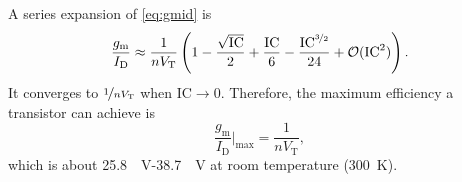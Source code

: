 \documentclass{article}[11pt]
\begin{document}
A series expansion of \eqref{eq:gmid} is
\begin{equation}\label{eq:gmid-exp}
\frac{g_{\mathrm{m}}}{I_{\mathrm{D}}} \approx \frac{1}{n V_{\mathrm{T}}} \left(1- \frac{\sqrt\mathrm{IC}}{2} + \frac{\mathrm{IC}}{6} - \frac{\mathrm{IC}^{\nicefrac{3}{2}}}{24} + \mathcal{O}(\mathrm{IC}^2)\right).
\end{equation}
It converges to $\nicefrac{1}{n V_{\mathrm{T}}}$ when $\mathrm{IC} \rightarrow 0$.
Therefore, the maximum efficiency a transistor can achieve is
\begin{equation}\label{eq:gmid-max}
\frac{g_{\mathrm{m}}}{I_{\mathrm{D}}}\bigg|_{\mathrm{max}} = \frac{1}{n V_{\mathrm{T}}},
\end{equation}
which is about \SI{25.8}{\per\volt}-\SI{38.7}{\per\volt} at 
room temperature (\SI{300}{\kelvin}).

\printbibliography
\end{document}

